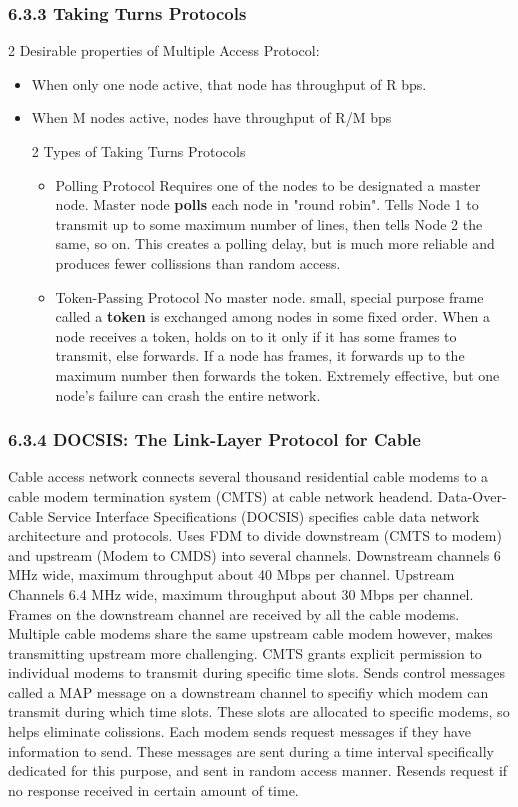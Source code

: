 \documentclass[11pt]{article}
\begin{document}
\subsubsection{6.3.3 Taking Turns Protocols}
\label{sec:orgdaee9b6}

2 Desirable properties of Multiple Access Protocol:
\begin{itemize}
\item When only one node active, that node has throughput of R bps.
\item When M nodes active, nodes have throughput of R/M bps

2 Types of Taking Turns Protocols

\begin{itemize}
\item Polling Protocol
Requires one of the nodes to be designated a master node. Master node \textbf{polls} each node in "round robin".
Tells Node 1 to transmit up to some maximum number of lines, then tells Node 2 the same, so on.
This creates a polling delay, but is much more reliable and produces fewer collissions than random access.

\item Token-Passing Protocol
No master node. small, special purpose frame called a \textbf{token} is exchanged among nodes in some fixed order. When a node receives a token, holds on to it only if it has some frames to transmit, else forwards. If a node has frames, it forwards up to the maximum number then forwards the token.
Extremely effective, but one node's failure can crash the entire network.
\end{itemize}
\end{itemize}

\subsubsection{6.3.4 DOCSIS: The Link-Layer Protocol for Cable}
\label{sec:orgba2b398}

Cable access network connects several thousand residential cable modems to a cable modem termination system (CMTS) at cable network headend.
Data-Over-Cable Service Interface Specifications (DOCSIS) specifies cable data network architecture and protocols.
Uses FDM to divide downstream (CMTS to modem) and upstream (Modem to CMDS) into several channels. Downstream channels 6 MHz wide, maximum throughput about 40 Mbps per channel. Upstream Channels 6.4 MHz wide, maximum throughput about 30 Mbps per channel.
Frames on the downstream channel are received by all the cable modems. Multiple cable modems share the same upstream cable modem however, makes transmitting upstream more challenging. CMTS grants explicit permission to individual modems to transmit during specific time slots. Sends control messages called a MAP message on a downstream channel to specifiy which modem can transmit during which time slots. These slots are allocated to specific modems, so helps eliminate colissions. Each modem sends request messages if they have information to send. These messages are sent during a time interval specifically dedicated for this purpose, and sent in random access manner. Resends request if no response received in certain amount of time. 
\end{document}
